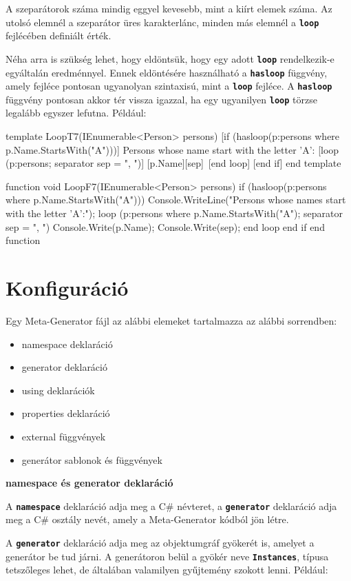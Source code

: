 \documentclass[12pt, a4paper]{report}
\newcommand{\ff}[1]{\textbf{\texttt{#1}}}
\newcommand{\bb}[1]{\textbf{#1}}
\begin{document}
A szeparátorok száma mindig eggyel kevesebb, mint a kiírt elemek száma. Az utolsó elemnél a szeparátor üres karakterlánc, minden más elemnél a \ff{loop} fejlécében definiált érték.

Néha arra is szükség lehet, hogy eldöntsük, hogy egy adott \ff{loop} rendelkezik-e egyáltalán eredménnyel. Ennek eldöntésére használható a \ff{hasloop} függvény, amely fejléce pontosan ugyanolyan szintaxisú, mint a \ff{loop} fejléce. A \ff{hasloop} függvény pontosan akkor tér vissza igazzal, ha egy ugyanilyen \ff{loop} törzse legalább egyszer lefutna. Például:

\begin{mgencode}
template LoopT7(IEnumerable<Person> persons)
  [if (hasloop(p:persons where p.Name.StartsWith("A")))]
Persons whose name start with the letter 'A':
    [loop (p:persons; separator sep = ", ")]
[p.Name][sep]\
    [end loop]
  [end if]
end template

function void LoopF7(IEnumerable<Person> persons)
  if (hasloop(p:persons where p.Name.StartsWith("A")))
    Console.WriteLine("Persons whose names start with the letter 'A':");
    loop (p:persons where p.Name.StartsWith("A"); separator sep = ", ")
      Console.Write(p.Name);
      Console.Write(sep);
    end loop
  end if
end function
\end{mgencode}

\section{Konfiguráció}

Egy Meta-Generator fájl az alábbi elemeket tartalmazza az alábbi sorrendben:
\begin{itemize}
	\item namespace deklaráció
	\item generator deklaráció
	\item using deklarációk
	\item properties deklaráció
	\item external függvények
	\item generátor sablonok és függvények
\end{itemize}

\bb{namespace és generator deklaráció}

A \ff{namespace} deklaráció adja meg a C\# névteret, a \ff{generator} deklaráció adja meg a C\# osztály nevét, amely a Meta-Generator kódból jön létre.

A \ff{generator} deklaráció adja meg az objektumgráf gyökerét is, amelyet a generátor be tud járni. A generátoron belül a gyökér neve \ff{Instances}, típusa tetszőleges lehet, de általában valamilyen gyűjtemény szokott lenni. Például:
\end{document}
